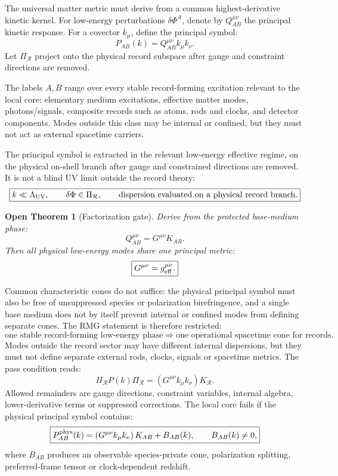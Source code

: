 \documentclass[11pt]{article}
\newtheorem{openthm}{Open Theorem}
\begin{document}
The universal matter metric must derive from a common highest-derivative
kinetic kernel.  For low-energy perturbations $\delta\Phi^A$, denote by
$Q_{AB}^{\mu\nu}$ the principal kinetic response.  For a covector $k_\mu$,
define the principal symbol:
\[
\boxed{
P_{AB}(k)=Q_{AB}^{\mu\nu}k_\mu k_\nu.
}
\]
Let \(\Pi_{\mathcal R}\) project onto the physical record subspace after
gauge and constraint directions are removed.

The labels \(A,B\) range over every stable record-forming excitation relevant
to the local core: elementary medium excitations, effective matter modes,
photons/signals, composite records such as atoms, rods and clocks, and
detector components.  Modes outside this class may be internal or confined,
but they must not act as external spacetime carriers.

The principal symbol is extracted in the relevant low-energy effective regime,
on the physical on-shell branch after gauge and constrained directions are
removed.  It is not a blind UV limit outside the record theory:
\[
\boxed{
k\ll\Lambda_{\rm UV},
\qquad
\delta\Phi\in\Pi_{\mathcal R},
\qquad
\text{dispersion evaluated on a physical record branch}.
}
\]

\begin{openthm}[Factorization gate]
Derive from the protected base-medium phase:
\[
\boxed{
Q_{AB}^{\mu\nu}
=
G^{\mu\nu}K_{AB}.
}
\]
Then all physical low-energy modes share one principal metric:
\[
\boxed{
G^{\mu\nu}=g_{\rm eff}^{\mu\nu}.
}
\]
\end{openthm}

Common characteristic cones do not suffice: the physical principal symbol must
also be free of unsuppressed species or polarization birefringence, and a
single base medium does not by itself prevent internal or confined modes from
defining separate cones.  The RMG statement is therefore restricted:
\[
\boxed{
\text{one stable record-forming low-energy phase}
\Rightarrow
\text{one operational spacetime cone for records}.
}
\]
Modes outside the record sector may have different internal dispersions, but
they must not define separate external rods, clocks, signals or spacetime
metrics.
The pass condition reads:
\[
\boxed{
\Pi_{\mathcal R}P(k)\Pi_{\mathcal R}
=
\left(G^{\mu\nu}k_\mu k_\nu\right)K_{\mathcal R}.
}
\]
Allowed remainders are gauge directions, constraint variables, internal
algebra, lower-derivative terms or suppressed corrections.  The local core
fails if the physical principal symbol contains:
\[
\boxed{
P_{AB}^{\rm phys}(k)
=
\left(G^{\mu\nu}k_\mu k_\nu\right)K_{AB}
+
B_{AB}(k),
\qquad
B_{AB}(k)\neq0,
}
\]
where \(B_{AB}\) produces an observable species-private cone, polarization
splitting, preferred-frame tensor or clock-dependent redshift.
\end{document}
